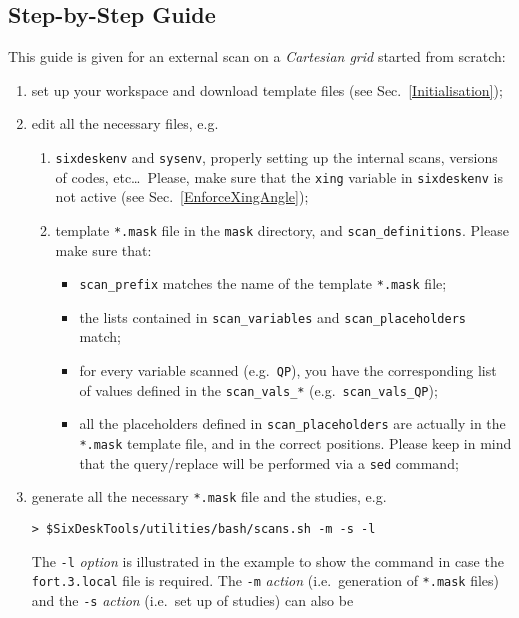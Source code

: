 \subsection{Step-by-Step Guide}
This guide is given for an external scan on a \emph{Cartesian grid}
started from scratch:
\begin{enumerate}
\item set up your workspace and download template files
  (see Sec.~\ref{Initialisation});
\item edit all the necessary files, e.g.
  \begin{enumerate}
  \item \texttt{sixdeskenv} and \texttt{sysenv}, properly setting up
    the internal scans, versions of codes, etc\ldots~Please, make sure
    that the \texttt{xing} variable in \texttt{sixdeskenv} is not
    active (see Sec.~\ref{EnforceXingAngle});
  \item template \texttt{*.mask} file in the \texttt{mask} directory,
    and \texttt{scan\_definitions}. Please make sure that:
    \begin{itemize}
    \item \texttt{scan\_prefix} matches the name of the template
      \texttt{*.mask} file;
    \item the lists contained in \texttt{scan\_variables} and
      \texttt{scan\_placeholders} match;
    \item for every variable scanned (e.g.~\texttt{QP}), you have the
      corresponding list of values defined in the \texttt{scan\_vals\_*}
      (e.g.~\texttt{scan\_vals\_QP});
    \item all the placeholders defined in \texttt{scan\_placeholders}
      are actually in the \texttt{*.mask} template file, and in the
      correct positions. Please keep in mind that the query/replace
      will be performed via a \texttt{sed} command;
    \end{itemize}
  \end{enumerate}
\item generate all the necessary \texttt{*.mask} file and the
  studies, e.g.
\begin{lstlisting}
> $SixDeskTools/utilities/bash/scans.sh -m -s -l
\end{lstlisting}
The \texttt{-l} \emph{option} is illustrated in the example to show
the command in case the \texttt{fort.3.local} file is required.
The \texttt{-m} \emph{action} (i.e.~generation of \texttt{*.mask} files)
and the \texttt{-s} \emph{action} (i.e.~set up of studies) can also be

\end{enumerate}
